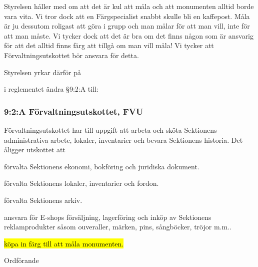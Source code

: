 \documentclass[../_main/handlingar.tex]{subfiles}
\begin{document}
\motionssvar

Styrelsen håller med om att det är kul att måla och att monumenten alltid borde vara vita. Vi tror dock att en Färgspecialist snabbt skulle bli en kaffepost. Måla är ju dessutom roligast att göra i grupp och man målar för att man vill, inte för att man måste. Vi tycker dock att det är bra om det finns någon som är ansvarig för att det alltid finns färg att tillgå om man vill måla! Vi tycker att Förvaltningsutskottet bör ansvara för detta. 

Styrelsen yrkar därför på

\begin{attsatser}
    \att i reglementet ändra \S9:2:A till:\par
    \subsubsection*{9:2:A Förvaltningsutskottet, FVU}
    Förvaltningsutskottet har till uppgift att arbeta och sköta Sektionens administrativa arbete, lokaler, inventarier och bevara Sektionens historia.
    Det åligger utskottet att
    \begin{itemizedash}
        \item förvalta Sektionens ekonomi, bokföring och juridiska dokument.
        \item förvalta Sektionens lokaler, inventarier och fordon.
        \item förvalta Sektionens arkiv.
        \item ansvara för E-shops försäljning, lagerföring och inköp av Sektionens reklamprodukter såsom ouveraller, märken, pins, sångböcker, tröjor m.m..
        \item \hl{köpa in färg till att måla monumenten.}    
    \end{itemizedash}
    \changenote
\end{attsatser}

\begin{signatures}{1}
    \ist
    \signature{Daniel Bakic}{Ordförande}
\end{signatures}
\end{document}
